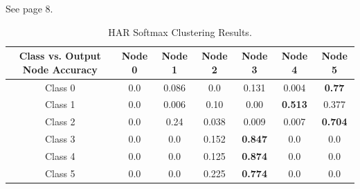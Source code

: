 \documentclass[journal]{IEEEtran}
\begin{document}



\newpage
{}
See page 8.
  \begin{table}
    \renewcommand{\arraystretch}{1.3}
    \caption{HAR Softmax Clustering Results.}
    \label{tab_har_sfx_all}
    \centering
    \begin{tabular}{|c|c|c|c|c|c|c|}
    \hline
    Class vs. Output Node Accuracy & Node 0 & Node 1 & Node 2 & Node 3 & Node 4 & Node 5\\
    \hline
    \hline
    Class 0   &  0.0    & 0.086 &  0.0    & 0.131  &  0.004    & \textbf{0.77}\\
    \hline
    Class 1   &  0.0  &  0.006 &  0.10    & 0.00  &  \textbf{0.513}    & 0.377\\
    \hline
    Class 2   &  0.0    & 0.24 &  0.038    & 0.009  &  0.007    & \textbf{0.704}\\
    \hline
    Class 3   &  0.0  &  0.0 &  0.152    & \textbf{0.847}  &  0.0    & 0.0\\
    \hline
    Class 4   &  0.0   & 0.0 &  0.125    & \textbf{0.874 } &  0.0    & 0.0\\
    \hline
    Class 5   &  0.0  &  0.0&  0.225    & \textbf{0.774  }&  0.0    & 0.0\\
    \hline
    \end{tabular}
    \end{table}
\end{document}
